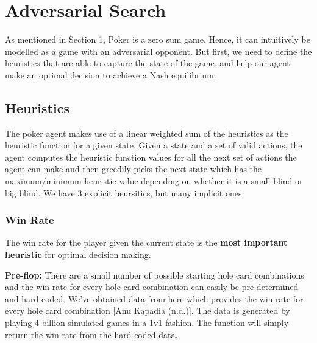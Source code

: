 \documentclass{article}
\begin{document}
\section{Adversarial Search}

As mentioned in Section 1, Poker is a zero sum game. Hence, it can intuitively be modelled as a game with an adversarial opponent. But first, we need to define the heuristics that are able to capture the state of the game, and help our agent make an optimal decision to achieve a Nash equilibrium.

\subsection{Heuristics}
The poker agent makes use of a linear weighted sum of the heuristics as the heuristic function for a given state. Given a state and a set of valid actions, the agent computes the heuristic function values for all the next set of actions the agent can make and then greedily picks the next state which has the maximum/minimum heuristic value depending on whether it is a small blind or big blind.
We have 3 explicit heursitics, but many implicit ones.

\subsubsection{Win Rate}

The win rate for the player given the current state is the {\bf most important heuristic} for optimal decision making.

\textbf{Pre-flop:} There are a small number of possible starting hole card combinations and the win rate for every hole card combination can easily be pre-determined and hard coded. We’ve obtained data from \href{https://www.cs.indiana.edu/~kapadia/nofoldem/2_wins.stats}{here} which provides the win rate for every hole card combination [Anu Kapadia (n.d.)]. The data is generated by playing 4 billion simulated games in a 1v1 fashion. The \texttt{} function will simply return the win rate from the hard coded data.
\end{document}
